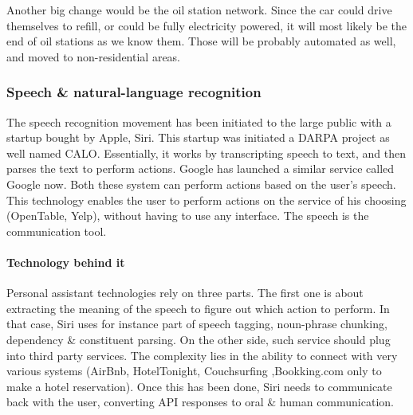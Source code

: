 \documentclass[12pt]{article}
\begin{document}
\vspace{5mm}

Another big change would be the oil station network. Since the car could drive
themselves to refill, or could be fully electricity powered, it will most likely
be the end of oil stations as we know them. Those will be probably automated as
well, and moved to non-residential areas.


\subsubsection{Speech \& natural-language recognition}

The speech recognition movement has been initiated to the large public with a
startup bought by Apple, Siri. This startup was initiated a DARPA project as
well named CALO. Essentially, it works by transcripting speech to text, and then
parses the text to perform actions. Google has launched a similar service called
Google now. Both these system can perform actions based on the user's speech.
This technology enables the user to perform actions on the service of his
choosing (OpenTable, Yelp), without having to use any interface. The speech is
the communication tool.
\\

\paragraph{Technology behind it}
Personal assistant technologies rely on three parts.
The first one is about extracting the meaning of the speech to figure out which
action to perform. In that case, Siri uses for instance part of speech tagging,
noun-phrase chunking, dependency \& constituent parsing. On the other side,
such service should plug into third party services. The complexity lies in the
ability to connect with very various systems (AirBnb, HotelTonight, Couchsurfing
,Bookking.com only to make a hotel reservation). Once this has been done, Siri
needs to communicate back with the user, converting API responses to oral \&
human communication.
\\
\end{document}
